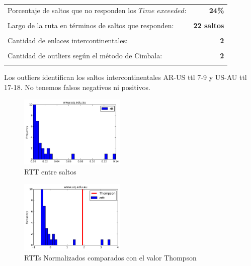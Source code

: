 \begin{center}
\begin{tabular}{p{6.5cm}r}
Porcentaje de saltos que no responden los $Time$ $exceeded$: & \textbf{24\%} \\ \\ 
Largo de la ruta en términos de saltos que responden: &\textbf{22 saltos} \\ \\
Cantidad de enlaces intercontinentales: & \textbf{2} \\ \\
Cantidad de outliers según el método de Cimbala: & \textbf{2} \\ \\
\end{tabular}
\end{center}

Los outliers identifican los saltos intercontinentales AR-US ttl 7-9 y US-AU ttl 17-18. No tenemos falsos negativos ni positivos.


\begin{figure}[H]
  \centering
    \includegraphics[width=0.45\textwidth]{histogramas_rtt/www-uq-edu-au.png}
  \caption{RTT entre saltos}
  \label{entropia-s}
\end{figure}

\begin{center}

\end{center}

\begin{figure}[H]
  \centering
    \includegraphics[width=0.45\textwidth]{histogramas_thompson/www-uq-edu-au.png}
  \caption{RTTs Normalizados comparados con el valor Thompson}
  \label{entropia-s}
\end{figure}

